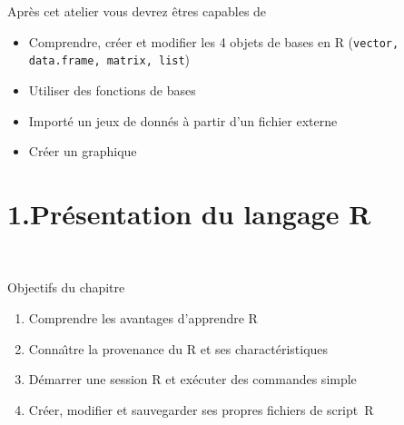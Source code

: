 \documentclass[11pt]{beamer}\usepackage[]{graphicx}\usepackage[]{color}
\newcommand{\code}[1]{\texttt{#1}}
\begin{document}
\begin{frame}[plain]
\hspace*{-1.0cm}\parbox[t]{\textwidth}{
\begin{block}{Après cet atelier vous devrez \^{e}tres capables de}
\begin{itemize}
\item Comprendre, créer et modifier les 4 objets de bases en R (\code{vector, data.frame, matrix, list}) 
\item Utiliser des fonctions de bases
\item Importé un jeux de donnés à partir d'un fichier externe
\item Créer un graphique 
\end{itemize}
\end{block}
}
\end{frame}


\section{1.Pr\'{e}sentation du langage R}

\begin{frame}[plain]
\hspace*{-1.0cm}\parbox[t]{\textwidth}{
 \begin{center}
  \Huge{\textcolor{white}{1. Pr\'{e}sentation du langage R}}
 \end{center}
 }
\end{frame}


\begin{frame}[plain]
\hspace*{-1.0cm}\parbox[t]{\textwidth}{
\begin{block}{Objectifs du chapitre}
\begin{enumerate}
\item Comprendre les avantages d'apprendre R
\item Conna\^{\i}tre la provenance du R et ses charact\'{e}ristiques
\item D\'{e}marrer une session R et ex\'{e}cuter des commandes simple
\item Cr\'{e}er, modifier et sauvegarder ses propres fichiers de \mbox{script R}
\end{enumerate}
\end{block}
}
\end{frame}
\end{document}
